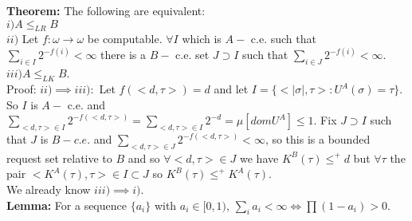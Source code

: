 \documentclass{article}
\begin{document}
      \textbf{Theorem:} The following are equivalent: \\
      $i) A \leq_{LR} B$ 
      \\ $ii) $ Let $f:\omega \to \omega$ be computable. $\forall I$ which is $A-$ c.e. such that $\sum_{i\in I} 2^{-f(i)}< \infty$ there is a $B-$ c.e. set $J \supset I$ such that $\sum_{i \in J} 2^{-f(i)} < \infty$.\\
      $iii) A \leq_{LK} B$.\\
      Proof: $ii) \implies iii): $ Let $f(<d,\tau>) = d$ and let $I = \{<|\sigma|,\tau>: U^A(\sigma) = \tau\}$. So $I$ is $A-$ c.e. and $\sum_{<d,\tau>\in I}2^{-f(<d,\tau>)} = \sum_{<d,\tau> \in I} 2^{-d} = \mu[dom U^A] \leq 1$. Fix $J \supset I$ such that $J$ is $B-c.e.$ and $\sum_{<d,\tau> \in J} 2^{-f(<d,\tau>)} < \infty$, so this is a bounded request set relative to $B$ and so $\forall <d,\tau> \in J$ we have $K^B(\tau) \leq^+ d$ but $\forall \tau$ the pair $<K^A(\tau), \tau> \in I \subset J$ so $K^B(\tau) \leq^+ K^A(\tau)$.
      \\ We already know $iii) \implies i)$.
      \\\textbf{Lemma: } For a sequence $\{a_i\}$ with $a_i \in [0,1)$, $\sum_i a_i < \infty \iff \prod (1-a_i) > 0$.
\end{document}
